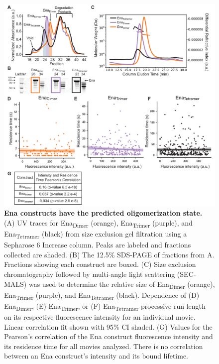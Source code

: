 \begin{figure}
\centering
\includegraphics[width=\textwidth]{img/ch02/Supp_Figure_2_PNAS.pdf}
\caption[Ena constructs have the predicted oligomerization state.]{\textbf{Ena constructs have the predicted oligomerization state.} (A) UV traces for Ena\textsubscript{Dimer} (orange), Ena\textsubscript{Trimer} (purple), and Ena\textsubscript{Tetramer} (black) from size exclusion gel filtration using a Sepharose 6 Increase column. Peaks are labeled and fractions collected are shaded. (B) The 12.5\% SDS-PAGE of fractions from A. Fractions showing each construct are boxed. (C) Size exclusion chromatography followed by multi-angle light scattering (SEC-MALS) was used to determine the relative size of Ena\textsubscript{Dimer} (orange), Ena\textsubscript{Trimer} (purple), and Ena\textsubscript{Tetramer} (black). Dependence of (D) Ena\textsubscript{Dimer}, (E) Ena\textsubscript{Trimer}, or (F) Ena\textsubscript{Tetramer} processive run length on its respective fluorescence intensity for an individual movie. Linear correlation fit shown with 95\% CI shaded. (G) Values for the Pearson's correlation of the Ena construct fluorescence intensity and its residence time for all movies analyzed. There is no correlation between an Ena construct's intensity and its bound lifetime.}
\label{fig:ena-sizes}
\end{figure}

